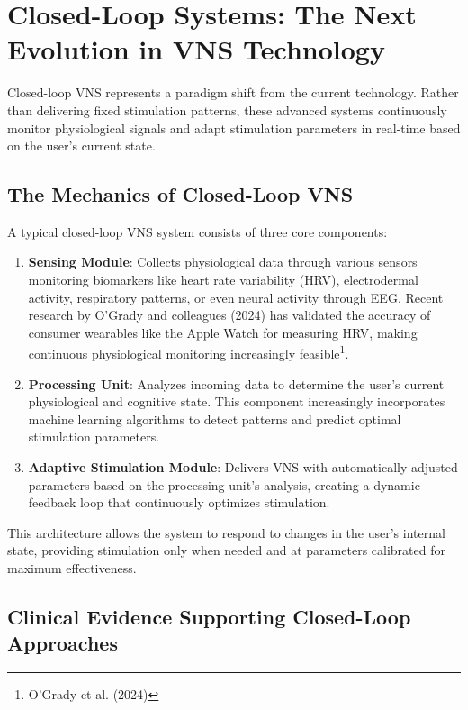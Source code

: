\documentclass[
  Letterpaper,
]{scrbook}
\begin{document}
\section{Closed-Loop Systems: The Next Evolution in VNS
Technology}\label{closed-loop-systems-the-next-evolution-in-vns-technology}

Closed-loop VNS represents a paradigm shift from the current technology.
Rather than delivering fixed stimulation patterns, these advanced
systems continuously monitor physiological signals and adapt stimulation
parameters in real-time based on the user's current state.

\subsection{The Mechanics of Closed-Loop
VNS}\label{the-mechanics-of-closed-loop-vns}

A typical closed-loop VNS system consists of three core components:

\begin{enumerate}
\def\labelenumi{\arabic{enumi}.}
\item
  \textbf{Sensing Module}: Collects physiological data through various
  sensors monitoring biomarkers like heart rate variability (HRV),
  electrodermal activity, respiratory patterns, or even neural activity
  through EEG. Recent research by O'Grady and colleagues (2024) has
  validated the accuracy of consumer wearables like the Apple Watch for
  measuring HRV, making continuous physiological monitoring increasingly
  feasible\footnote{O'Grady et al. (2024)}.
\item
  \textbf{Processing Unit}: Analyzes incoming data to determine the
  user's current physiological and cognitive state. This component
  increasingly incorporates machine learning algorithms to detect
  patterns and predict optimal stimulation parameters.
\item
  \textbf{Adaptive Stimulation Module}: Delivers VNS with automatically
  adjusted parameters based on the processing unit's analysis, creating
  a dynamic feedback loop that continuously optimizes stimulation.
\end{enumerate}

This architecture allows the system to respond to changes in the user's
internal state, providing stimulation only when needed and at parameters
calibrated for maximum effectiveness.

\subsection{Clinical Evidence Supporting Closed-Loop
Approaches}\label{clinical-evidence-supporting-closed-loop-approaches}
\end{document}
